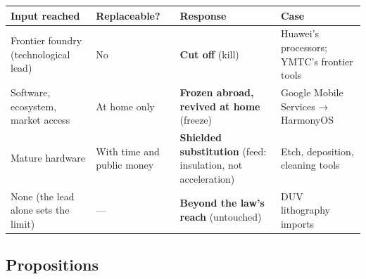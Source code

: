 \documentclass[12pt]{article}
\begin{document}
\begin{table}[htbp]\centering\footnotesize{}\begin{tabular}{@{}
  >{\raggedright\arraybackslash}p{}
  >{\raggedright\arraybackslash}p{}
  >{\raggedright\arraybackslash}p{}
  >{\raggedright\arraybackslash}p{}@{}}
\toprule
\begin{minipage}[b]{\linewidth}\raggedright
Input reached
\end{minipage} & \begin{minipage}[b]{\linewidth}\raggedright
Replaceable?
\end{minipage} & \begin{minipage}[b]{\linewidth}\raggedright
Response
\end{minipage} & \begin{minipage}[b]{\linewidth}\raggedright
Case
\end{minipage} \\
\midrule
Frontier foundry (technological lead) & No & \textbf{Cut off} (kill) & Huawei's processors; YMTC's frontier tools \\
\hdashline
Software, ecosystem, market access & At home only & \textbf{Frozen abroad, revived at home} (freeze) & Google Mobile Services → HarmonyOS \\
\hdashline
Mature hardware & With time and public money & \textbf{Shielded substitution} (feed: insulation, not acceleration) & Etch, deposition, cleaning tools \\
\hdashline
None (the lead alone sets the limit) & --- & \textbf{Beyond the law's reach} (untouched) & DUV lithography imports \\
\bottomrule
\end{tabular}\end{table}


\subsection{Propositions}
\end{document}
